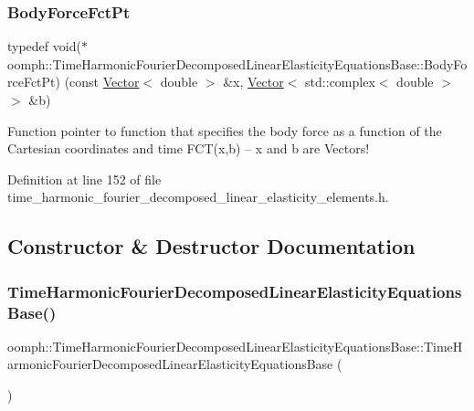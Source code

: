 \subsubsection{\texorpdfstring{Body\+Force\+Fct\+Pt}{BodyForceFctPt}}
{\footnotesize\ttfamily typedef void($\ast$ oomph\+::\+Time\+Harmonic\+Fourier\+Decomposed\+Linear\+Elasticity\+Equations\+Base\+::\+Body\+Force\+Fct\+Pt) (const \hyperlink{classoomph_1_1Vector}{Vector}$<$ double $>$ \&x, \hyperlink{classoomph_1_1Vector}{Vector}$<$ std\+::complex$<$ double $>$ $>$ \&b)}



Function pointer to function that specifies the body force as a function of the Cartesian coordinates and time F\+C\+T(x,b) -- x and b are Vectors! 



Definition at line 152 of file time\+\_\+harmonic\+\_\+fourier\+\_\+decomposed\+\_\+linear\+\_\+elasticity\+\_\+elements.\+h.



\subsection{Constructor \& Destructor Documentation}
\mbox{\label{classoomph_1_1TimeHarmonicFourierDecomposedLinearElasticityEquationsBase_a8c30a3f47a37399b416c493d81504406}} 
\subsubsection{\texorpdfstring{Time\+Harmonic\+Fourier\+Decomposed\+Linear\+Elasticity\+Equations\+Base()}{TimeHarmonicFourierDecomposedLinearElasticityEquationsBase()}}
{\footnotesize\ttfamily oomph\+::\+Time\+Harmonic\+Fourier\+Decomposed\+Linear\+Elasticity\+Equations\+Base\+::\+Time\+Harmonic\+Fourier\+Decomposed\+Linear\+Elasticity\+Equations\+Base (\begin{DoxyParamCaption}{ }\end{DoxyParamCaption})\hspace{0.3cm}{\ttfamily [inline]}}



